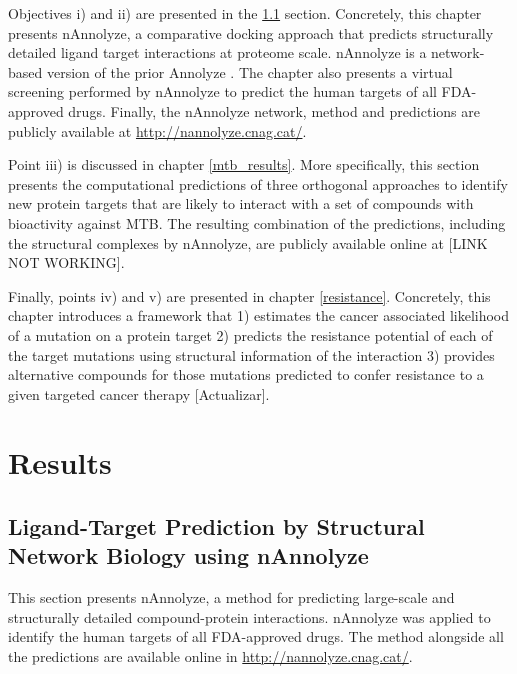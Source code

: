 \documentclass[11pt, b5paper,twoside]{tesi_upf}
\begin{document}
\par Objectives i) and ii) are presented in the \ref{nannolyze} section. Concretely, this chapter presents nAnnolyze, a comparative docking approach that predicts structurally detailed ligand target interactions at proteome scale. nAnnolyze is a network-based version of the prior Annolyze \cite{Marti-Renom2007}. The chapter also presents a virtual screening performed by nAnnolyze to predict the human targets of all FDA-approved drugs. Finally, the nAnnolyze network, method and predictions are publicly available at  \url{http://nannolyze.cnag.cat/}.

\par Point iii) is discussed in chapter \ref{mtb_results}. More specifically, this section presents the computational predictions    of three orthogonal approaches to identify new protein targets that are likely to interact with a set of compounds with bioactivity against MTB. The resulting combination of the predictions, including the structural complexes by nAnnolyze, are publicly available online at [LINK NOT WORKING].      

\par Finally, points iv) and v) are presented in chapter \ref{resistance}. Concretely, this chapter introduces a framework that 1) estimates the cancer associated likelihood of a mutation on a protein target 2) predicts the resistance potential of each of the target mutations using structural information of the interaction 3) provides alternative compounds for those mutations predicted to confer resistance to a given targeted cancer therapy [Actualizar].




\section{Results}

\subsection{Ligand-Target Prediction by Structural Network Biology using nAnnolyze}\label{nannolyze}

\par This section presents nAnnolyze, a method for predicting large-scale and structurally detailed compound-protein interactions. nAnnolyze was applied to identify the human targets of all FDA-approved drugs. The method alongside all the predictions are available online in \url{http://nannolyze.cnag.cat/}.
\end{document}
